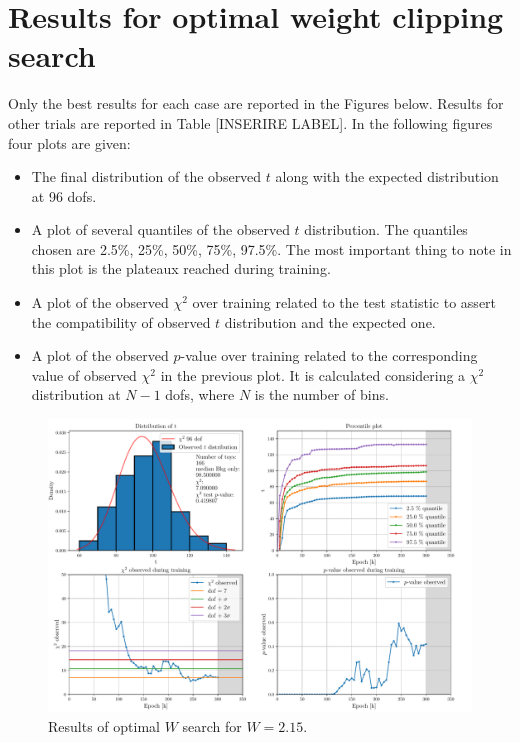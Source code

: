\section{Results for optimal weight clipping search}
Only the best results for each case are reported in the Figures below. Results for other trials are reported in Table [INSERIRE LABEL]. In the following figures four plots are given:
\begin{itemize}
	\item The final distribution of the observed $t$ along with the expected distribution at 96 dofs.
	\item A plot of several quantiles of the observed $t$ distribution. The quantiles chosen are 2.5\%, 25\%, 50\%, 75\%, 97.5\%. The most important thing to note in this plot is the plateaux reached during training.
	\item A plot of the observed $\chi^2$ over training related to the test statistic to assert the compatibility of observed $t$ distribution and the expected one.
	\item A plot of the observed $p$-value over training related to the corresponding value of observed $\chi^2$ in the previous plot. It is calculated considering a $\chi^2$ distribution at $N-1$ dofs, where $N$ is the number of bins.
\end{itemize}

\begin{figure}[H]
	\centering
	\includegraphics[width=1.0\textwidth]{Python/W_CLIP/ref100000_bkg20000_sig0/data_ref100000_bkg20000_sig0_wclip2-15.pdf}
	\caption{Results of optimal $W$ search for $W=2.15$.}
	\label{fig:REF100000_BKG20000_SIG0_WCLIP2.15}
\end{figure}

